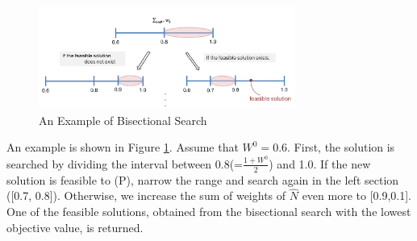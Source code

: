 \documentclass[11pt]{article}
\begin{document}
\begin{figure}[h] 
	\begin{center}
		\includegraphics[width=0.75\textwidth]{bisection}
		\caption{An Example of Bisectional Search} \label{fig:bisection}
	\end{center}
\end{figure}
An example is shown in Figure \ref{fig:bisection}. Assume that $W^0 = 0.6$. First, the solution is searched by dividing the interval between 0.8(=$\frac{1+W^0}{2}$) and 1.0. If the new solution is feasible to (P), narrow the range and search again in the left section ([0.7, 0.8]). Otherwise, we increase the sum of weights of $\hat{N}$ even more to [0.9,0.1]. One of the feasible solutions, obtained from the bisectional search with the lowest objective value, is returned. 


	
\end{document}
